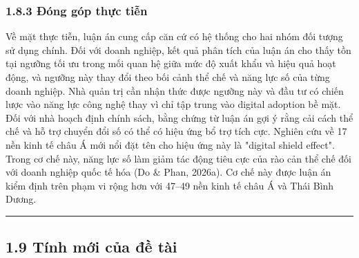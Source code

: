 \documentclass[12pt,a4paper]{article}
\begin{document}
\hypertarget{183-ux111uxf3ng-guxf3p-thux1ef1c-tiux1ec5n}{%
\subsubsection{1.8.3 Đóng góp thực
tiễn}\label{183-ux111uxf3ng-guxf3p-thux1ef1c-tiux1ec5n}}

Về mặt thực tiễn, luận án cung cấp căn cứ có hệ thống cho hai nhóm đối
tượng sử dụng chính. Đối với doanh nghiệp, kết quả phân tích của luận án
cho thấy tồn tại ngưỡng tối ưu trong mối quan hệ giữa mức độ xuất khẩu
và hiệu quả hoạt động, và ngưỡng này thay đổi theo bối cảnh thể chế và
năng lực số của từng doanh nghiệp. Nhà quản trị cần nhận thức được
ngưỡng này và đầu tư có chiến lược vào năng lực công nghệ thay vì chỉ
tập trung vào digital adoption bề mặt. Đối với nhà hoạch định chính
sách, bằng chứng từ luận án gợi ý rằng cải cách thể chế và hỗ trợ chuyển
đổi số có thể có hiệu ứng bổ trợ tích cực. Nghiên cứu về 17 nền kinh tế
châu Á mới nổi đặt tên cho hiệu ứng này là "digital shield effect".
Trong cơ chế này, năng lực số làm giảm tác động tiêu cực của rào cản thể
chế đối với doanh nghiệp quốc tế hóa (Do \& Phan, 2026a). Cơ chế này
được luận án kiểm định trên phạm vi rộng hơn với 47--49 nền kinh tế châu
Á và Thái Bình Dương.

\begin{center}\rule{0.5\linewidth}{0.5pt}\end{center}

\hypertarget{19-tuxednh-mux1edbi-cux1ee7a-ux111ux1ec1-tuxe0i}{%
\subsection{1.9 Tính mới của đề
tài}\label{19-tuxednh-mux1edbi-cux1ee7a-ux111ux1ec1-tuxe0i}}
\end{document}
